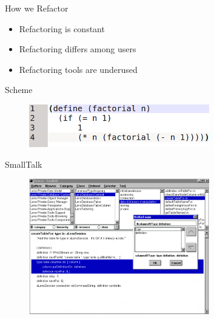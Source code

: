 \documentclass[xcolor=dvipsnames]{beamer}
\begin{document}
\begin{frame}{How we Refactor}
  \begin{itemize}
  \item {
    Refactoring is constant
  }
  \item {
    Refactoring differs among users
  }
  \item {
    Refactoring tools are underused
  }
  \end{itemize}
\end{frame}
\begin{frame}{Scheme}
    \begin{figure}[htbp]
      \centering
      \includegraphics[width=0.7\textwidth]{img/SchemeFact1.png}
      \label{fig:Scheme}
    \end{figure}
\end{frame}

\begin{frame}{SmallTalk}
  \begin{figure}[htbp]
    \centering
    \includegraphics[width=0.7\textwidth]{img/smalltalk.png}
    \label{fig:Smalltalk}
  \end{figure}
\end{frame}
\end{document}
